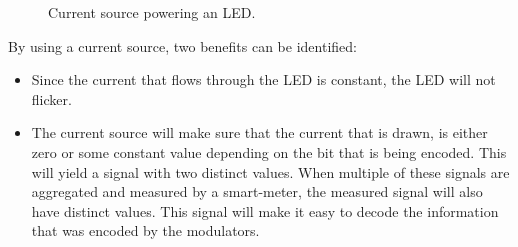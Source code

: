 \begin{figure}[t]
\begin{minipage}[b]{0.5\textwidth}
			\caption{Current source powering an LED.}
			\label{fig:dc-led-current-source}
		\end{minipage}
	\end{figure}

	By using a current source, two benefits can be identified:

	\begin{itemize}
		
		\item Since the current that flows through the LED is constant, the LED will not flicker.

		\item The current source will make sure that the current that is drawn, is either zero or some constant value depending on the bit that is being encoded.
		This will yield a signal with two distinct values.
		When multiple of these signals are aggregated and measured by a smart-meter, the measured signal will also have distinct values.
		This signal will make it easy to decode the information that was encoded by the modulators.

	\end{itemize}